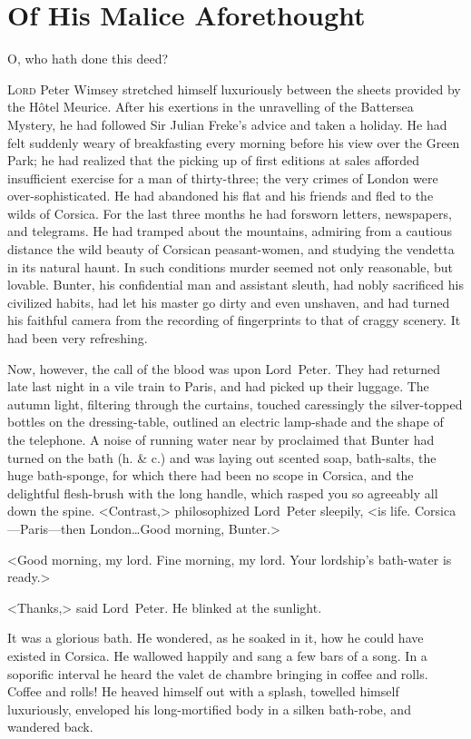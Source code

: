 \chapter{Of His Malice Aforethought}

\epigraph{O, who hath done this deed?}{}

\lettrine{L}{ord} Peter Wimsey stretched himself luxuriously be\-tween the sheets provided by the Hôtel Meurice. After his exertions in the unravelling of the Battersea Mystery, he had followed Sir Julian Freke's advice and taken a holiday. He had felt suddenly weary of breakfasting every morning before his view over the Green Park; he had realized that the picking up of first editions at sales afforded insufficient exercise for a man of thirty-three; the very crimes of London were over-sophisticated. He had abandoned his flat and his friends and fled to the wilds of Corsica. For the last three months he had forsworn letters, newspapers, and telegrams. He had tramped about the mountains, admiring from a cautious distance the wild beauty of Corsican peasant-women, and studying the vendetta in its natural haunt. In such conditions murder seemed not only reasonable, but lovable. Bunter, his confidential man and assistant sleuth, had nobly sacrificed his civilized habits, had let his master go dirty and even unshaven, and had turned his faithful camera from the recording of fingerprints to that of craggy scenery. It had been very refreshing.

Now, however, the call of the blood was upon Lord~Peter. They had returned late last night in a vile train to Paris, and had picked up their luggage. The autumn light, filtering through the curtains, touched caressingly the silver-topped bottles on the dressing-table, outlined an electric lamp-shade and the shape of the telephone. A noise of running water near by proclaimed that Bunter had turned on the bath (h. \& c.) and was laying out scented soap, bath-salts, the huge bath-sponge, for which there had been no scope in Corsica, and the delightful flesh-brush with the long handle, which rasped you so agreeably all down the spine. <Contrast,> philosophized Lord~Peter sleepily, <is life. Corsica—Paris—then London\dots Good morning, Bunter.>

<Good morning, my lord. Fine morning, my lord. Your lordship's bath-water is ready.>

<Thanks,> said Lord~Peter. He blinked at the sunlight.

It was a glorious bath. He wondered, as he soaked in it, how he could have existed in Corsica. He wallowed happily and sang a few bars of a song. In a soporific interval he heard the valet de chambre bringing in coffee and rolls. Coffee and rolls! He heaved himself out with a splash, towelled himself luxuriously, enveloped his long-mortified body in a silken bath-robe, and wandered back.

